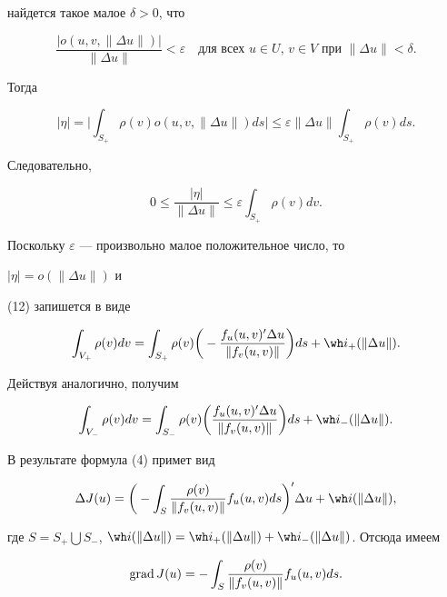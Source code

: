 найдется такое малое $\delta>0$, что


$$


\frac{|o(u,v,\|\Delta u\|)|}{\|\Delta u\|}<\varepsilon\quad


\text{для всех $u\in U$, $v\in V$ при $\|\Delta u\|<\delta$}.


$$


Тогда


$$


|\eta|=\bigg|\int_{S_+}\rho(v)o(u,v,\|\Delta u\|)ds\bigg|\le


\varepsilon\|\Delta u\|\int_{S_+}\rho(v)ds.


$$


Следовательно,


$$


0\le\frac{|\eta|}{\|\Delta u\|}\le\varepsilon\int_{S_+}


\rho(v)dv.


$$


Поскольку $\varepsilon$ --- произвольно малое положительное число, то 


$|\eta|=o(\|\Delta u\|)$ и


(12) запишется в виде


$$


\int_{V_+}\rho(v)dv=\int_{S_+}\rho(v)\bigg(


-\frac{f_u(u,v)'\Delta u}{\|f_v(u,v)\|}\bigg)ds+


\wh i_+(\|\Delta u\|).


$$


Действуя аналогично, получим


$$


\int_{V_-}\rho(v)dv=\int_{S_-}\rho(v)\bigg(


\frac{f_u(u,v)'\Delta u}{\|f_v(u,v)\|}\bigg)ds+


\wh i_-(\|\Delta u\|).


$$


В результате формула (4) примет вид


$$


\Delta J(u)=\bigg(-\int_S\frac{\rho(v)}{\|f_v(u,v)\|}


f_u(u,v)ds\bigg)' \Delta u+\wh i(\|\Delta u\|),


$$


где $S=S_+\bigcup S_-$, $\wh i(\|\Delta u\|)=\wh i_+(\|\Delta u\|)+\wh 


i_-(\|\Delta u\|)$. Отсюда имеем


\begin{equation}


\grad J(u)=-\int_S\frac{\rho(v)}{\|f_v(u,v)\|}


f_u(u,v)ds.


\end{equation}


